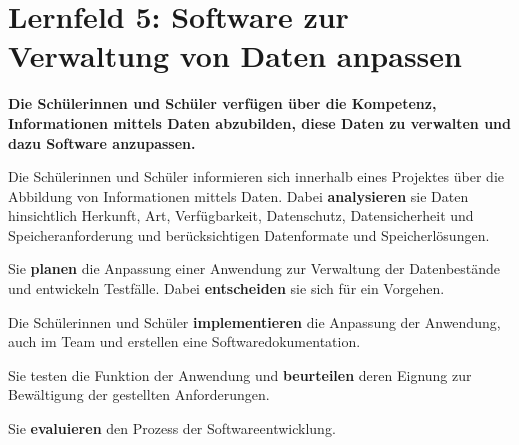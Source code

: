 \chapter{Lernfeld 5: Software zur Verwaltung von Daten anpassen}

\textbf{Die Schülerinnen und Schüler verfügen über die Kompetenz, Informationen mittels
    Daten abzubilden, diese Daten zu verwalten und dazu Software anzupassen.}

Die Schülerinnen und Schüler informieren sich innerhalb eines Projektes über die Abbildung
von Informationen mittels Daten. Dabei \textbf{analysieren} sie Daten hinsichtlich Herkunft, Art,
Verfügbarkeit, Datenschutz, Datensicherheit und Speicheranforderung und berücksichtigen
Datenformate und Speicherlösungen.

Sie \textbf{planen} die Anpassung einer Anwendung zur Verwaltung der Datenbestände und entwickeln Testfälle. Dabei \textbf{entscheiden} sie sich für ein Vorgehen.

Die Schülerinnen und Schüler \textbf{implementieren} die Anpassung der Anwendung, auch im
Team und erstellen eine Softwaredokumentation.

Sie testen die Funktion der Anwendung und \textbf{beurteilen} deren Eignung zur Bewältigung der
gestellten Anforderungen.

Sie \textbf{evaluieren} den Prozess der Softwareentwicklung.

